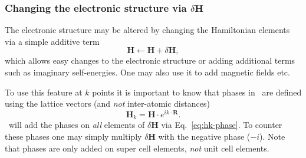 \subsubsection{Changing the electronic structure via
    \texorpdfstring{$\delta\mathbf H$}{dH}}

The electronic structure may be altered by changing the Hamiltonian
elements via a simple additive term
\begin{equation}
  \mathbf H \leftarrow \mathbf H + \delta\mathbf H,
\end{equation}
which allows easy changes to the electronic structure or adding
additional terms such as imaginary self-energies. One may also use it
to add magnetic fields etc.

To use this feature at $k$ points it is important to know that phases
in \tbtrans\ are defined using the lattice vectors (and \emph{not}
inter-atomic distances)
\begin{equation}
  \mathbf H_k = \mathbf H \cdot e^{i k \cdot \mathbf R}.
  \label{eq:hk-phase}
\end{equation}
\tbtrans\ will add the phases on \emph{all} elements of $\delta\mathbf
H$ via Eq.~\eqref{eq:hk-phase}. To counter these phases one may simply
multiply $\delta\mathbf H$ with the negative phase ($-i$). Note that
phases are only added on super cell elements, \emph{not} unit cell
elements. 

